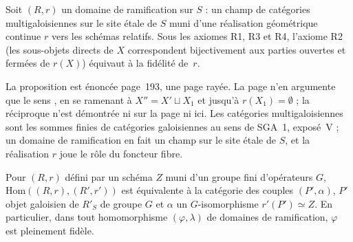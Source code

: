 \begin{encadre}
\begin{theoreme*}\nonverifie
Soit $(R, r)$ un domaine de ramification sur $S$ : un champ de catégories multigaloisiennes sur le site étale de $S$ muni d'une réalisation géométrique continue $r$ vers les schémas relatifs. Sous les axiomes R1, R3 et R4, l'axiome R2 (les sous-objets directs de $X$ correspondent bijectivement aux parties ouvertes et fermées de $r(X)$) équivaut à la fidélité de~$r$.
\end{theoreme*}
\end{encadre}
{\small La proposition est énoncée page~193, une page rayée. La page n'en argumente que le sens , en se ramenant à $X'' = X' \sqcup X_1$ et jusqu'à $r(X_1) = \emptyset$ ; la réciproque n'est démontrée ni sur la page ni ici. Les catégories multigaloisiennes sont les sommes finies de catégories galoisiennes au sens de SGA~1, exposé~V \cite{sga1} ; un domaine de ramification en fait un champ sur le site étale de $S$, et la réalisation $r$ joue le rôle du foncteur fibre.\par}

\begin{encadre}
\begin{enonce}\nonverifie
Pour $(R, r)$ défini par un schéma $Z$ muni d'un groupe fini d'opérateurs $G$, $\mathrm{Hom}((R,r),(R',r'))$ est équivalente à la catégorie des couples $(P', \alpha)$, $P'$ objet galoisien de $R'_S$ de groupe $G$ et $\alpha$ un $G$-isomorphisme $r'(P') \simeq Z$. En particulier, dans tout homomorphisme $(\varphi, \lambda)$ de domaines de ramification, $\varphi$ est pleinement fidèle.
\end{enonce}
\end{encadre}


